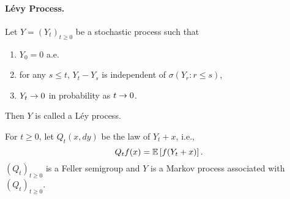 \paragraph{L\'evy Process.} Let $Y=(Y_t)_{t \geq 0}$ be a stochastic process such that
\begin{enumerate}[label=(\roman*)]
    \item $Y_0 = 0$ a.e.
    \item for any $s \leq t$, $Y_t - Y_s$ is independent of $\sigma(Y_r\colon r \leq s)$,
    \item $Y_t \rightarrow 0$ in probability as $t \rightarrow 0$.
\end{enumerate}
Then $Y$ is called a L\'ey process.

\begin{thm}
    For $t \geq 0$, let $Q_t(x,dy)$ be the law of $Y_t + x$, i.e.,
    \begin{equation*}
        Q_tf(x) = \mathbb{E}\left[f(Y_t+x)\right].
    \end{equation*}
    $(Q_t)_{t \geq 0}$ is a Feller semigroup and $Y$ is a Markov process associated with $(Q_t)_{t \geq 0}$.
\end{thm}